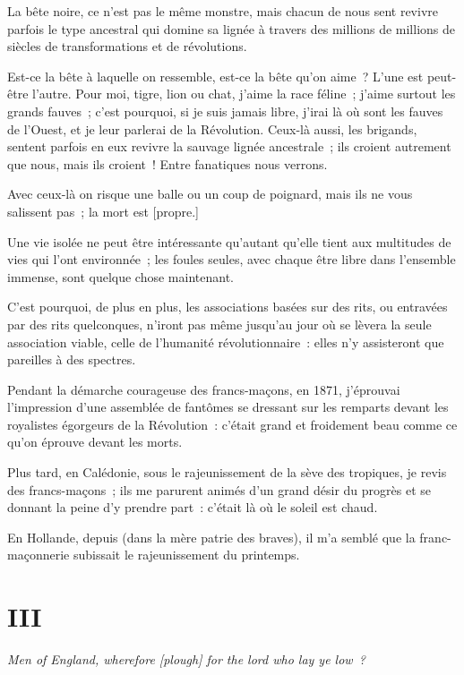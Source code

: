 \documentclass[french,twoside]{book} %
\newcommand\corr[1]{#1}
\newcommand\chapteropen{} %
\newcommand\chapterclose{} %
\begin{document}
\noindent La bête noire, ce n’est pas le même monstre, mais chacun de nous sent revivre parfois le type ancestral qui domine sa lignée à travers des millions de millions de siècles de transformations et de révolutions.\par
Est-ce la bête à laquelle on ressemble, est-ce la bête qu’on aime ? L’une est peut-être l’autre. Pour moi, tigre, lion ou chat, j’aime la race féline ; j’aime surtout les grands fauves ; c’est pourquoi, si je suis jamais libre, j’irai là où sont les fauves de l’Ouest, et je leur parlerai de la Révolution. Ceux-là aussi, les brigands, sentent parfois en eux revivre la sauvage lignée ancestrale ; ils croient autrement que nous, mais ils croient ! Entre fanatiques nous verrons.\par
Avec ceux-là on risque une balle ou un coup  de poignard, mais ils ne vous salissent pas ; la mort est [{\corr propre.}]\par
Une vie isolée ne peut être intéressante qu’autant qu’elle tient aux multitudes de vies qui l’ont environnée ; les foules seules, avec chaque être libre dans l’ensemble immense, sont quelque chose maintenant.\par
C’est pourquoi, de plus en plus, les associations basées sur des rits, ou entravées par des rits quelconques, n’iront pas même jusqu’au jour où se lèvera la seule association viable, celle de l’humanité révolutionnaire : elles n’y assisteront que pareilles à des spectres.\par
Pendant la démarche courageuse des francs-maçons, en 1871, j’éprouvai l’impression d’une assemblée de fantômes se dressant sur les remparts devant les royalistes égorgeurs de la Révolution : c’était grand et froidement beau comme ce qu’on éprouve devant les morts.\par
Plus tard, en Calédonie, sous le rajeunissement de la sève des tropiques, je revis des francs-maçons ; ils me parurent animés d’un grand désir du progrès et se donnant la peine d’y prendre part : c’était là où le soleil est chaud.\par
En Hollande, depuis (dans la mère patrie des braves), il m’a semblé que la franc-maçonnerie subissait le rajeunissement du printemps.
\chapterclose


\chapteropen
 \chapter[{III}]{III}
\label{p2.3}
\noindent \emph{Men of England, wherefore [{\corr plough}] for the lord who lay ye low ?}\par
\end{document}
